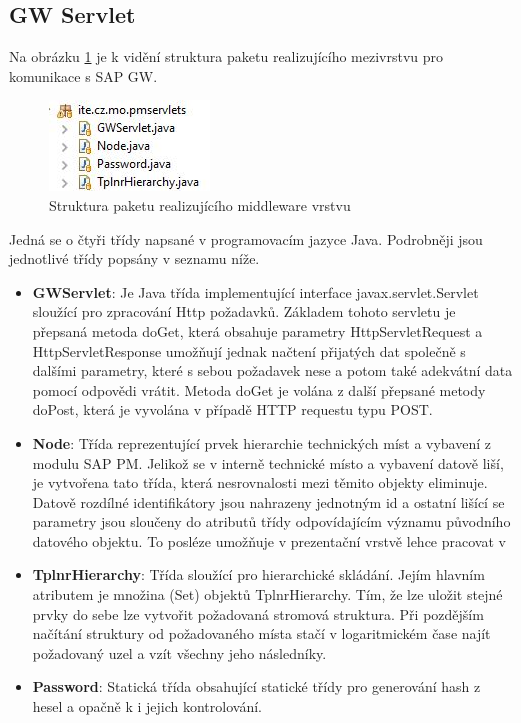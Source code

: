 \documentclass[thesis=M,czech]{FITthesis}[2012/06/26]
\begin{document}
\subsection{GW Servlet}
Na obrázku \ref{img:gw_servlet_structure} je k vidění struktura paketu realizujícího mezivrstvu pro komunikace s SAP GW. 
\begin{figure}[H]
	\centering
	\includegraphics[]{images/gw_servlet_structure}
	\caption{Struktura paketu realizujícího middleware vrstvu}
	\label{img:gw_servlet_structure}
\end{figure}
Jedná se o čtyři třídy napsané v programovacím jazyce Java. Podrobněji jsou jednotlivé třídy popsány v seznamu níže.

\begin{itemize}
	\item
	\textbf{GWServlet}: Je Java třída implementující interface javax.servlet.Servlet sloužící pro zpracování Http požadavků. Základem tohoto servletu je přepsaná metoda doGet, která obsahuje parametry HttpServletRequest a HttpServletResponse umožňují jednak načtení přijatých dat společně s dalšími parametry, které s sebou požadavek nese a potom také adekvátní data pomocí odpovědi vrátit. Metoda doGet je volána z další přepsané metody doPost, která je vyvolána v případě HTTP requestu typu POST. 
	\item
	\textbf{Node}: Třída reprezentující prvek hierarchie technických míst a vybavení z modulu SAP PM. Jelikož se v interně technické místo a vybavení datově liší, je vytvořena tato třída, která nesrovnalosti mezi těmito objekty eliminuje. Datově rozdílné identifikátory jsou nahrazeny jednotným id a ostatní lišící se parametry jsou sloučeny do atributů třídy odpovídajícím významu původního datového objektu. To posléze umožňuje v prezentační vrstvě lehce pracovat v 
	\item
	\textbf{TplnrHierarchy}: Třída sloužící pro hierarchické skládání. Jejím hlavním atributem je množina (Set) objektů TplnrHierarchy. Tím, že lze uložit stejné prvky do sebe lze vytvořit požadovaná stromová struktura. Při pozdějším načítání struktury od požadovaného místa stačí v logaritmickém čase najít požadovaný uzel a vzít všechny jeho následníky.
	\item
	\textbf{Password}: Statická třída obsahující statické třídy pro generování hash z hesel a opačně k i jejich kontrolování.
\end{itemize} 
\end{document}
